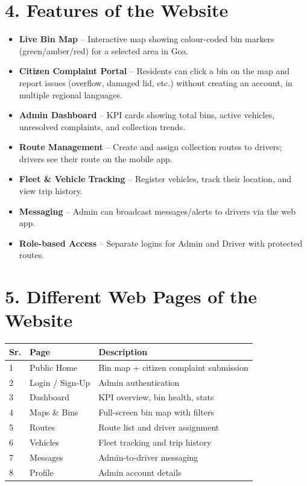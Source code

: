 \documentclass[12pt,a4paper]{article}
\begin{document}
\section*{4. Features of the Website}

\begin{itemize}[leftmargin=*]
    \item \textbf{Live Bin Map} -- Interactive map showing colour-coded
          bin markers (green/amber/red) for a selected area in Goa.
    \item \textbf{Citizen Complaint Portal} -- Residents can click a bin
          on the map and report issues (overflow, damaged lid, etc.)
          without creating an account, in multiple regional languages.
    \item \textbf{Admin Dashboard} -- KPI cards showing total bins,
          active vehicles, unresolved complaints, and collection trends.
    \item \textbf{Route Management} -- Create and assign collection routes
          to drivers; drivers see their route on the mobile app.
    \item \textbf{Fleet \& Vehicle Tracking} -- Register vehicles, track
          their location, and view trip history.
    \item \textbf{Messaging} -- Admin can broadcast messages/alerts to
          drivers via the web app.
    \item \textbf{Role-based Access} -- Separate logins for Admin and
          Driver with protected routes.
\end{itemize}

\clearpage
\section*{5. Different Web Pages of the Website}

\begin{center}
\begin{tabular}{lll}
\toprule
\textbf{Sr.} & \textbf{Page} & \textbf{Description} \\
\midrule
1 & Public Home     & Bin map + citizen complaint submission \\
2 & Login / Sign-Up & Admin authentication \\
3 & Dashboard       & KPI overview, bin health, stats \\
4 & Maps \& Bins    & Full-screen bin map with filters \\
5 & Routes          & Route list and driver assignment \\
6 & Vehicles        & Fleet tracking and trip history \\
7 & Messages        & Admin-to-driver messaging \\
8 & Profile         & Admin account details \\
\bottomrule
\end{tabular}
\end{center}
\end{document}
